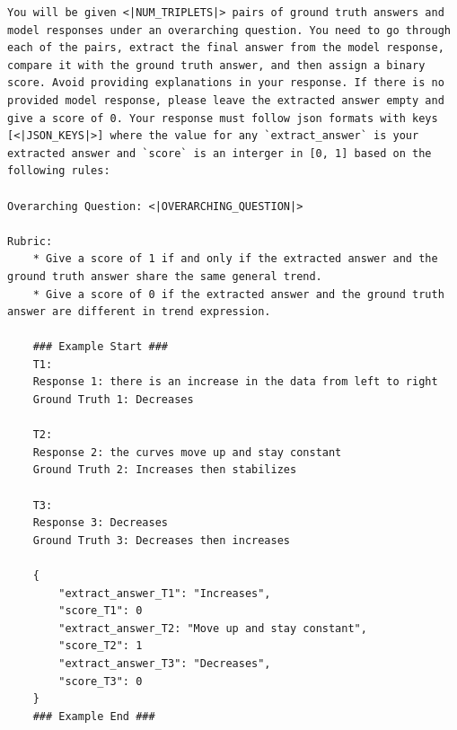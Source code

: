 \newpage
\begin{example}
\begin{lstlisting}
You will be given <|NUM_TRIPLETS|> pairs of ground truth answers and model responses under an overarching question. You need to go through each of the pairs, extract the final answer from the model response, compare it with the ground truth answer, and then assign a binary score. Avoid providing explanations in your response. If there is no provided model response, please leave the extracted answer empty and give a score of 0. Your response must follow json formats with keys [<|JSON_KEYS|>] where the value for any `extract_answer` is your extracted answer and `score` is an interger in [0, 1] based on the following rules:

Overarching Question: <|OVERARCHING_QUESTION|>

Rubric:
    * Give a score of 1 if and only if the extracted answer and the ground truth answer share the same general trend.
    * Give a score of 0 if the extracted answer and the ground truth answer are different in trend expression.

    ### Example Start ###
    T1:
    Response 1: there is an increase in the data from left to right
    Ground Truth 1: Decreases

    T2:
    Response 2: the curves move up and stay constant
    Ground Truth 2: Increases then stabilizes

    T3:
    Response 3: Decreases
    Ground Truth 3: Decreases then increases

    {
        "extract_answer_T1": "Increases",
        "score_T1": 0
        "extract_answer_T2: "Move up and stay constant",
        "score_T2": 1
        "extract_answer_T3": "Decreases",
        "score_T3": 0
    }
    ### Example End ###
\end{lstlisting} 
\end{example}

